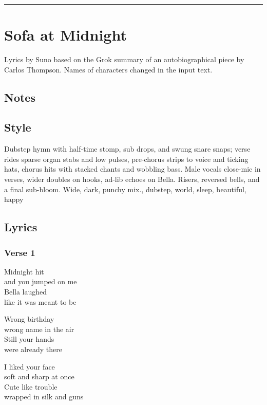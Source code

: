 \begin{center}\rule{0.5\linewidth}{0.5pt}\end{center}

\section{Sofa at Midnight}\label{sofa-at-midnight}

Lyrics by Suno based on the Grok summary of an autobiographical piece by
Carlos Thompson. Names of characters changed in the input text.

\subsection{Notes}\label{notes-26}

\subsection{Style}\label{style-25}

Dubstep hymn with half-time stomp, sub drops, and swung snare snaps;
verse rides sparse organ stabs and low pulses, pre-chorus strips to
voice and ticking hats, chorus hits with stacked chants and wobbling
bass. Male vocals close-mic in verses, wider doubles on hooks, ad-lib
echoes on Bella. Risers, reversed bells, and a final sub-bloom. Wide,
dark, punchy mix., dubstep, world, sleep, beautiful, happy

\subsection{Lyrics}\label{lyrics-25}

\subsubsection{Verse 1}\label{verse-1-21}

Midnight hit\\
and you jumped on me\\
Bella laughed\\
like it was meant to be

Wrong birthday\\
wrong name in the air\\
Still your hands\\
were already there

I liked your face\\
soft and sharp at once\\
Cute like trouble\\
wrapped in silk and guns

